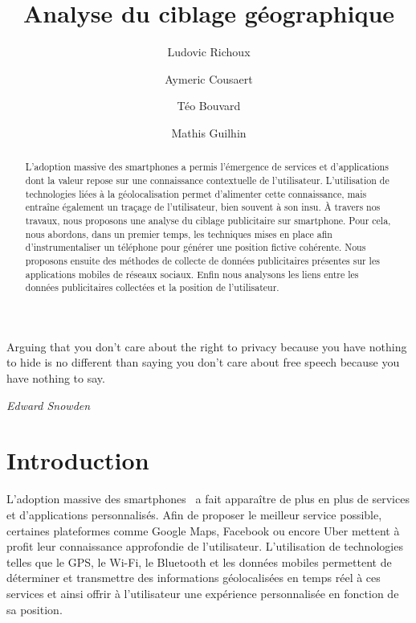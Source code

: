 \documentclass[runningheads]{llncs}
\begin{document}
\title{Analyse du ciblage géographique} 

\author{
    Ludovic Richoux \and
    Aymeric Cousaert \and
    Téo Bouvard \and 
    Mathis Guilhin
}

%


\maketitle

\epigraph{
    Arguing that you don't care about the right to privacy because you have nothing to hide is no different than saying you don't care about free speech because you have nothing to say. \cite{edward_snowden_riama_2015}}{\textit{Edward Snowden}
}

\begin{abstract}

L'adoption massive des smartphones a permis l'émergence de services et d'applications dont la valeur repose sur une connaissance contextuelle de l'utilisateur. L'utilisation de technologies liées à la géolocalisation permet d'alimenter cette connaissance, mais entraîne également un traçage de l'utilisateur, bien souvent à son insu. À travers nos travaux, nous proposons une analyse du ciblage publicitaire sur smartphone. Pour cela, nous abordons, dans un premier temps, les techniques mises en place afin d'instrumentaliser un téléphone pour générer une position fictive cohérente. Nous proposons ensuite des méthodes de collecte de données publicitaires présentes sur les applications mobiles de réseaux sociaux. Enfin nous analysons les liens entre les données publicitaires collectées et la position de l'utilisateur. 



\end{abstract}

\section{Introduction}

L'adoption massive des smartphones~\cite{pew_research_center_demographics_2019} a fait apparaître de plus en plus de services et d'applications personnalisés. Afin de proposer le meilleur service possible, certaines plateformes comme Google Maps, Facebook ou encore Uber mettent à profit leur connaissance approfondie de l'utilisateur. L'utilisation de technologies telles que le GPS, le Wi-Fi, le Bluetooth et les données mobiles permettent de déterminer et transmettre des informations géolocalisées en temps réel à ces services et ainsi offrir à l'utilisateur une expérience personnalisée en fonction de sa position.
\end{document}
